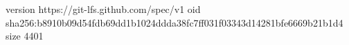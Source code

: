 version https://git-lfs.github.com/spec/v1
oid sha256:b8910b09d54fdb69dd1b1024ddda38fc7ff031f03343d14281bfe6669b21b1d4
size 4401
